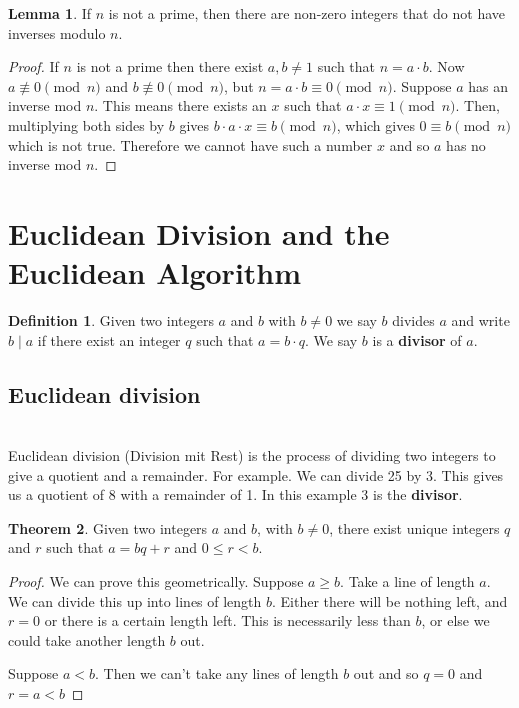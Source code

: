 \documentclass[12pt]{amsart}
\theoremstyle{definition}
\newtheorem{theorem}{Theorem}
\newtheorem{lemma}[theorem]{Lemma}
\theoremstyle{definition}
\newtheorem{definition}{Definition}
\theoremstyle{remark}
\begin{document}
\begin{lemma}
If $n$ is not a prime, then there are non-zero integers that do not have inverses modulo $n$.
\end{lemma}
\begin{proof}
If $n$ is not a prime then there exist $a, b \neq 1$ such that $n = a \cdot b$. Now $a \not\equiv 0 \pmod n$ and $b \not\equiv 0 \pmod n$, but $n=a\cdot b \equiv 0 \pmod n$. Suppose $a$ has an inverse mod $n$. This means there exists an $x$ such that $a\cdot x \equiv 1 \pmod n$. Then, multiplying both sides by $b$ gives $b\cdot a \cdot x \equiv b \pmod n$, which gives $0\equiv b \pmod n$ which is not true. Therefore we cannot have such a number $x$ and so $a$ has no inverse mod $n$.
\end{proof}

\section{Euclidean Division and the Euclidean Algorithm}

\begin{definition}
Given two integers $a$ and $b$ with $b\neq0$ we say $b$ divides $a$ and write $b\mid a$ if there exist an integer $q$ such that $a=b\cdot q$. We say $b$ is a \textbf{divisor} of $a$.
\end{definition}

\subsection*{Euclidean division}
\hfill \\

Euclidean division (Division mit Rest) is the process of dividing two integers to give a quotient and a remainder. For example. We can divide 25 by 3. This gives us a quotient of 8 with a remainder of 1. In this example 3 is the \textbf{divisor}.
\begin{theorem}
Given two integers $a$ and $b$, with $b \neq0$, there exist unique integers $q$ and $r$ such that $a = bq+r$ and $0\le r<b$. 
\end{theorem}
\begin{proof}
We can prove this geometrically. Suppose $a \ge b$. Take a line of length $a$. We can divide this up into lines of length $b$. Either there will be nothing left, and $r=0$ or there is a certain length left. This is necessarily less than $b$, or else we could take another length $b$ out.

Suppose $a<b$. Then we can't take any lines of length $b$ out and so $q = 0$ and $r = a <b$
\end{proof}
\end{document}
